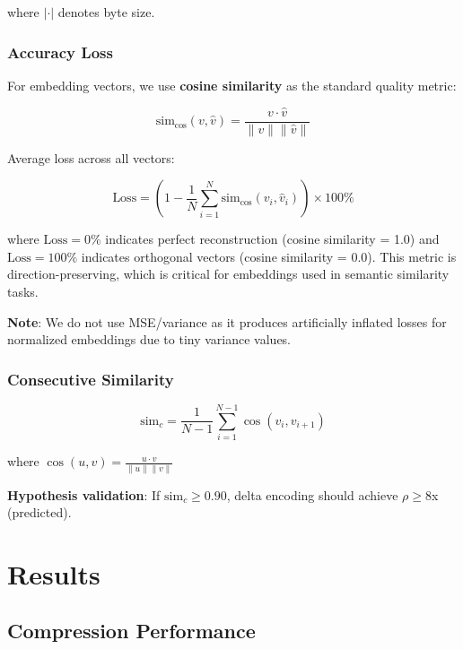 \documentclass[11pt,a4paper]{article}
\begin{document}
where $|\cdot|$ denotes byte size.

\subsubsection{Accuracy Loss}

For embedding vectors, we use \textbf{cosine similarity} as the standard quality metric:

\begin{equation}
\text{sim}_{\cos}(v, \hat{v}) = \frac{v \cdot \hat{v}}{\|v\| \|\hat{v}\|}
\end{equation}

Average loss across all vectors:

\begin{equation}
\text{Loss} = \left(1 - \frac{1}{N}\sum_{i=1}^N \text{sim}_{\cos}(v_i, \hat{v}_i)\right) \times 100\%
\end{equation}

where $\text{Loss} = 0\%$ indicates perfect reconstruction (cosine similarity = 1.0) and $\text{Loss} = 100\%$ indicates orthogonal vectors (cosine similarity = 0.0). This metric is direction-preserving, which is critical for embeddings used in semantic similarity tasks.

\textbf{Note}: We do not use MSE/variance as it produces artificially inflated losses for normalized embeddings due to tiny variance values.

\subsubsection{Consecutive Similarity}

\begin{equation}
\text{sim}_c = \frac{1}{N-1} \sum_{i=1}^{N-1} \cos(v_i, v_{i+1})
\end{equation}

where $\cos(u,v) = \frac{u \cdot v}{\|u\| \|v\|}$

\textbf{Hypothesis validation}: If $\text{sim}_c \geq 0.90$, delta encoding should achieve $\rho \geq 8$x (predicted).

\section{Results}

\subsection{Compression Performance}
\end{document}

